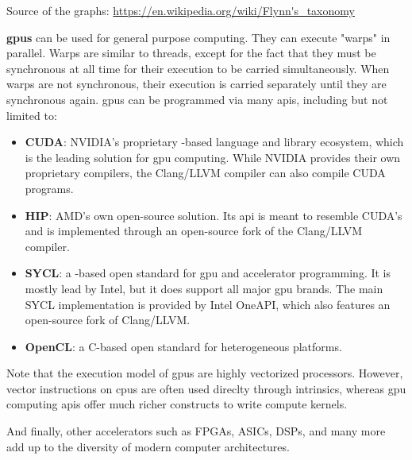 \documentclass[main]{subfiles}
\begin{document}
{\footnotesize Source of the graphs:
\url{https://en.wikipedia.org/wiki/Flynn's_taxonomy}}

\textbf{\glspl{gpu}} can be used for general purpose
computing. They can execute "warps" in parallel. Warps are similar to threads,
except for the fact that they must be synchronous at all time for their
execution to be carried simultaneously. When warps are not synchronous,
their execution is carried separately until they are synchronous again.
\glspl{gpu} can be programmed via many \glspl{api},
including but not limited to:

\begin{itemize}
\item
\textbf{CUDA}: NVIDIA's proprietary \cpp-based language and library
ecosystem, which is the leading solution for \gls{gpu} computing.
While NVIDIA provides their own proprietary compilers, the Clang/LLVM
compiler can also compile CUDA programs.

\item
\textbf{HIP}: AMD's own open-source solution. Its \gls{api} is meant to
resemble CUDA's and is implemented through an open-source fork of the
Clang/LLVM compiler.

\item
\textbf{SYCL}: a \cpp-based open standard for \gls{gpu} and
accelerator programming. It is mostly lead by Intel, but it does support
all major \gls{gpu} brands. The main SYCL implementation is provided by
Intel OneAPI, which also features an open-source fork of Clang/LLVM.

\item
\textbf{OpenCL}: a C-based open standard for heterogeneous platforms.

\end{itemize}
Note that the execution model of \glspl{gpu} are highly vectorized processors.
However, vector instructions on \glspl{cpu} are often used direclty through
intrinsics, whereas \gls{gpu} computing \glspl{api} offer much richer constructs
to write compute kernels.

And finally, other accelerators such as FPGAs, ASICs, DSPs, and many more
add up to the diversity of modern computer architectures.
\end{document}
